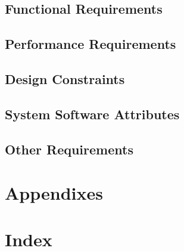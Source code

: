 \documentclass{article}
\begin{document}
    \subsection{Functional Requirements}
    \subsection{Performance Requirements}
    \subsection{Design Constraints}
    \subsection{System Software Attributes}
    \subsection{Other Requirements}
    
\section*{Appendixes}
\section*{Index}
\end{document}
